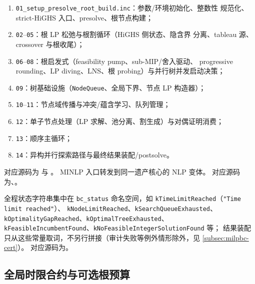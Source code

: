 \begin{enumerate}
  \item \texttt{01\_setup\_presolve\_root\_build.inc}：参数/环境初始化、整数性
        规范化、strict-HiGHS 入口、presolve、根节点构建；
  \item \texttt{02}–\texttt{05}：根 LP 松弛与根割循环（HiGHS 侧状态、隐含界
        分离、tableau 源、crossover 与根收尾）；
  \item \texttt{06}–\texttt{08}：根启发式（feasibility pump、sub-MIP/舍入驱动、
        progressive rounding、LP diving、LNS、根 probing）与并行树并发启动决策；
  \item \texttt{09}：树基础设施（\texttt{NodeQueue}、全局下界、节点 LP 构造器）；
  \item \texttt{10}–\texttt{11}：节点域传播与冲突/蕴含学习、队列管理；
  \item \texttt{12}：单子节点处理（LP 求解、池分离、割生成）与对偶证明消费；
  \item \texttt{13}：顺序主循环；
  \item \texttt{14}：异构并行探索路径与最终结果装配/postsolve。
\end{enumerate}

对应源码为
与 。
MINLP 入口转发到同一遗产核心的 NLP 变体。
对应源码为、。

全程状态字符串集中在 \texttt{bc\_status} 命名空间，如
\texttt{kTimeLimitReached}（\texttt{"Time limit reached"}）、
\texttt{kNodeLimitReached}、\texttt{kSearchQueueExhausted}、
\texttt{kOptimalityGapReached}、\texttt{kOptimalTreeExhausted}、
\texttt{kFeasibleIncumbentFound}、\texttt{kNoFeasibleIntegerSolutionFound} 等；
结果装配只从这些常量取词，不另行拼接（审计失败等例外情形除外，见
\ref{subsec:milpbc-cert}）。
对应源码为。

\subsection{全局时限合约与可选根预算}\label{subsec:milpbc-deadline}

